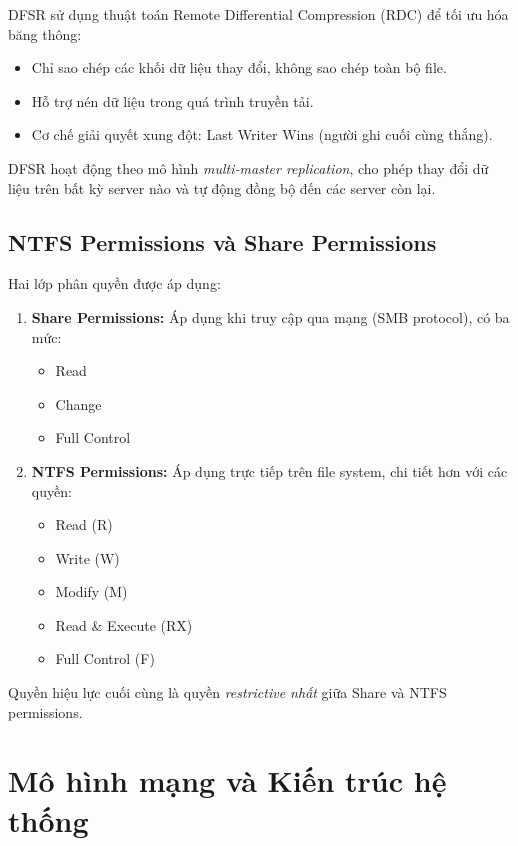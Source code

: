 DFSR sử dụng thuật toán Remote Differential Compression (RDC) để tối ưu hóa băng thông:

\begin{itemize}
    \item Chỉ sao chép các khối dữ liệu thay đổi, không sao chép toàn bộ file.
    \item Hỗ trợ nén dữ liệu trong quá trình truyền tải.
    \item Cơ chế giải quyết xung đột: Last Writer Wins (người ghi cuối cùng thắng).
\end{itemize}

DFSR hoạt động theo mô hình \textit{multi-master replication}, cho phép thay đổi dữ liệu trên bất kỳ server nào và tự động đồng bộ đến các server còn lại.

\subsection{NTFS Permissions và Share Permissions}

Hai lớp phân quyền được áp dụng:

\begin{enumerate}
    \item \textbf{Share Permissions:} Áp dụng khi truy cập qua mạng (SMB protocol), có ba mức:
    \begin{itemize}
        \item Read
        \item Change
        \item Full Control
    \end{itemize}
    
    \item \textbf{NTFS Permissions:} Áp dụng trực tiếp trên file system, chi tiết hơn với các quyền:
    \begin{itemize}
        \item Read (R)
        \item Write (W)
        \item Modify (M)
        \item Read \& Execute (RX)
        \item Full Control (F)
    \end{itemize}
\end{enumerate}

Quyền hiệu lực cuối cùng là quyền \textit{restrictive nhất} giữa Share và NTFS permissions.

\section{Mô hình mạng và Kiến trúc hệ thống}

